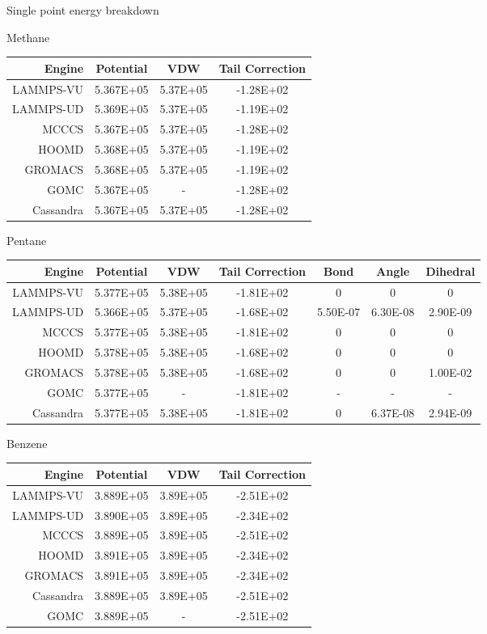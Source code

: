 Single point energy breakdown

Methane
\begin{table}[]
\begin{tabular}{rccc}
Engine & Potential & VDW & Tail Correction \\ \hline
LAMMPS-VU & 5.367E+05 & 5.37E+05 & -1.28E+02 \\
LAMMPS-UD & 5.369E+05 & 5.37E+05 & -1.19E+02 \\
MCCCS & 5.367E+05 & 5.37E+05 & -1.28E+02 \\
HOOMD & 5.368E+05 & 5.37E+05 & -1.19E+02 \\
GROMACS & 5.368E+05 & 5.37E+05 & -1.19E+02 \\
GOMC & 5.367E+05 & - & -1.28E+02 \\
Cassandra & 5.367E+05 & 5.37E+05 & -1.28E+02
\end{tabular}
\end{table}

Pentane
\begin{table}[]
\begin{tabular}{rcccccc}
Engine & Potential & VDW & Tail Correction & Bond & Angle & Dihedral \\ \hline
LAMMPS-VU & 5.377E+05 & 5.38E+05 & -1.81E+02 & 0 & 0 & 0 \\
LAMMPS-UD & 5.366E+05 & 5.37E+05 & -1.68E+02 & 5.50E-07 & 6.30E-08 & 2.90E-09 \\
MCCCS & 5.377E+05 & 5.38E+05 & -1.81E+02 & 0 & 0 & 0 \\
HOOMD & 5.378E+05 & 5.38E+05 & -1.68E+02 & 0 & 0 & 0 \\
GROMACS & 5.378E+05 & 5.38E+05 & -1.68E+02 & 0 & 0 & 1.00E-02 \\
GOMC & 5.377E+05 & - & -1.81E+02 & - & - & - \\
Cassandra & 5.377E+05 & 5.38E+05 & -1.81E+02 & 0 & 6.37E-08 & 2.94E-09
\end{tabular}
\end{table}

Benzene
\begin{table}[]
\begin{tabular}{rccc}
Engine & Potential & VDW & Tail Correction \\ \hline
LAMMPS-VU & 3.889E+05 & 3.89E+05 & -2.51E+02 \\
LAMMPS-UD & 3.890E+05 & 3.89E+05 & -2.34E+02 \\
MCCCS & 3.889E+05 & 3.89E+05 & -2.51E+02 \\
HOOMD & 3.891E+05 & 3.89E+05 & -2.34E+02 \\
GROMACS & 3.891E+05 & 3.89E+05 & -2.34E+02 \\
Cassandra & 3.889E+05 & 3.89E+05 & -2.51E+02 \\
GOMC & 3.889E+05 & - & -2.51E+02
\end{tabular}
\end{table}

